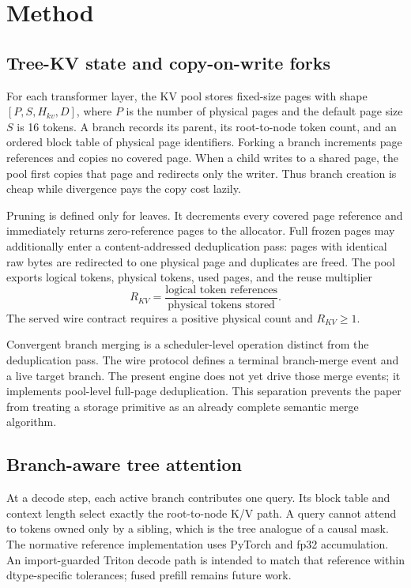 \section{Method}

\subsection{Tree-KV state and copy-on-write forks}

For each transformer layer, the KV pool stores fixed-size pages with shape
$[P,S,H_{kv},D]$, where $P$ is the number of physical pages and the default page
size $S$ is 16 tokens.  A branch records its parent, its root-to-node token
count, and an ordered block table of physical page identifiers.  Forking a
branch increments page references and copies no covered page.  When a child
writes to a shared page, the pool first copies that page and redirects only the
writer.  Thus branch creation is cheap while divergence pays the copy cost
lazily.

Pruning is defined only for leaves.  It decrements every covered page reference
and immediately returns zero-reference pages to the allocator.  Full frozen
pages may additionally enter a content-addressed deduplication pass: pages with
identical raw bytes are redirected to one physical page and duplicates are
freed.  The pool exports logical tokens, physical tokens, used pages, and the
reuse multiplier
\begin{equation}
  R_{KV}=\frac{\text{logical token references}}
                 {\text{physical tokens stored}}.
\end{equation}
The served wire contract requires a positive physical count and $R_{KV}\geq1$.

Convergent branch merging is a scheduler-level operation distinct from the
deduplication pass.  The wire protocol defines a terminal branch-merge event and
a live target branch.  The present engine does not yet drive those merge events;
it implements pool-level full-page deduplication.  This separation prevents the
paper from treating a storage primitive as an already complete semantic merge
algorithm.

\subsection{Branch-aware tree attention}

At a decode step, each active branch contributes one query.  Its block table
and context length select exactly the root-to-node K/V path.  A query cannot
attend to tokens owned only by a sibling, which is the tree analogue of a causal
mask.  The normative reference implementation uses PyTorch and fp32
accumulation.  An import-guarded Triton decode path is intended to match that
reference within dtype-specific tolerances; fused prefill remains future work.

